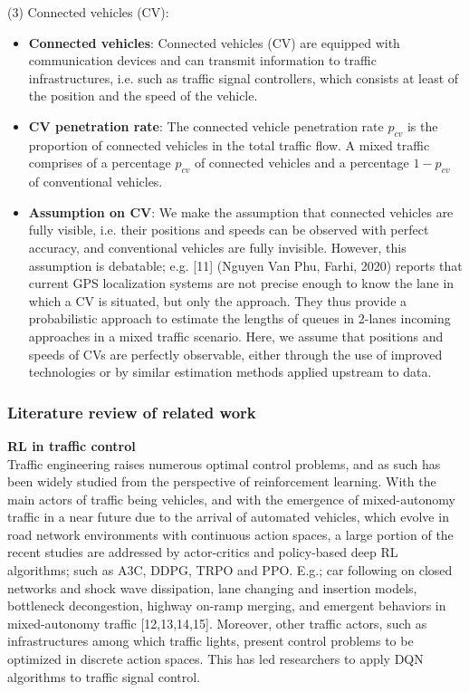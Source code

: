 (3) Connected vehicles (CV):
\begin{itemize}
\setlength\itemsep{-0.5em}
  \item \textbf{Connected vehicles}: Connected vehicles (CV) are equipped with communication devices and can transmit information to traffic infrastructures, i.e. such as traffic signal controllers, which consists at least of the position and the speed of the vehicle.
  \item \textbf{CV penetration rate}: The connected vehicle penetration rate $p_{cv}$ is the proportion of connected vehicles in the total traffic flow. A mixed traffic comprises of a percentage $p_{cv}$ of connected vehicles and a percentage $1-p_{cv}$ of conventional vehicles.
  \item \textbf{Assumption on CV}: We make the assumption that connected vehicles are fully visible, i.e. their positions and speeds can be observed with perfect accuracy, and conventional vehicles are fully invisible. However, this assumption is debatable; e.g. [11] (Nguyen Van Phu, Farhi, 2020) reports that current GPS localization systems are not precise enough to know the lane in which a CV is situated, but only the approach. They thus provide a probabilistic approach to estimate the lengths of queues in 2-lanes incoming approaches in a mixed traffic scenario. Here, we assume that positions and speeds of CVs are perfectly observable, either through the use of improved technologies or by similar estimation methods applied upstream to data.
\end{itemize}

\subsubsection{Literature review of related work}

\textbf{RL in traffic control} \\
Traffic engineering raises numerous optimal control problems, and as such has been widely studied from the perspective of reinforcement learning. With the main actors of traffic being vehicles, and with the emergence of mixed-autonomy traffic in a near future due to the arrival of automated vehicles, which evolve in road network environments with continuous action spaces, a large portion of the recent studies are addressed by actor-critics and policy-based deep RL algorithms; such as A3C, DDPG, TRPO and PPO.
E.g.; car following on closed networks and shock wave dissipation, lane changing and insertion models, bottleneck decongestion, highway on-ramp merging, and emergent behaviors in mixed-autonomy traffic [12,13,14,15]. Moreover, other traffic actors, such as infrastructures among which traffic lights, present control problems to be optimized in discrete action spaces. This has led researchers to apply DQN algorithms to traffic signal control. \\

